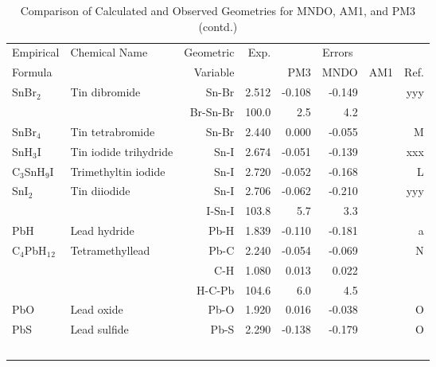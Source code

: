\begin{table}
\caption{\label{geotabs}Comparison of Calculated and Observed Geometries for 
MNDO, AM1, and PM3 (contd.)}
\begin{center}
\compresstable
\begin{tabular}{llrrrrrr}
 Empirical  & Chemical Name &  Geometric &  Exp. & \multicolumn{3}{c}{Errors} & \\
  Formula   &               &  Variable &        & PM3  & MNDO  &  AM1 & Ref.\\
\hline
 SnBr$_2$       & Tin dibromide                      &Sn-Br          &     2.512   &    -0.108 &    -0.149 &  &   yyy \\
             &                                    &Br-Sn-Br     &     100.0   &       2.5 &       4.2 &    &       \\
 SnBr$_4$       & Tin tetrabromide                   &Sn-Br          &     2.440   &     0.000 &    -0.055 &  &     M \\
 SnH$_3$I       & Tin iodide trihydride              &Sn-I           &     2.674   &    -0.051 &    -0.139 &  &   xxx \\
 C$_3$SnH$_9$I     & Trimethyltin iodide                &Sn-I           &     2.720   &    -0.052 &    -0.168 &  &     L \\
 SnI$_2$        & Tin diiodide                       &Sn-I           &     2.706   &    -0.062 &    -0.210 &  &   yyy \\
             &                                    &I-Sn-I       &     103.8   &       5.7 &       3.3 &    &       \\
 PbH         & Lead hydride                       &Pb-H           &     1.839   &    -0.110 &    -0.181 &  &     a \\
 C$_4$PbH$_1$$_2$     & Tetramethyllead                    &Pb-C           &     2.240   &    -0.054 &    -0.069 &  &     N \\
             &                                    &C-H            &     1.080   &     0.013 &     0.022 &  &       \\
             &                                    &H-C-Pb       &     104.6   &       6.0 &       4.5 &    &       \\
 PbO         & Lead oxide                         &Pb-O           &     1.920   &     0.016 &    -0.038 &  &     O \\
 PbS         & Lead sulfide                       &Pb-S           &     2.290   &    -0.138 &    -0.179 &  &     O \\
$$
\end{tabular}
\end{center}
\end{table}
